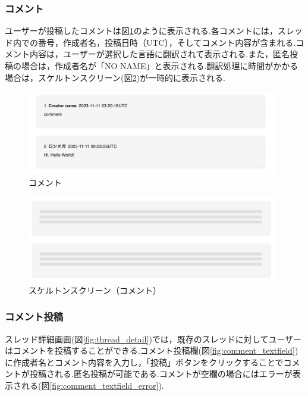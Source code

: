 \documentclass[b5paper,12pt,dvipdfmx]{jsreport}
\begin{document}
\newpage

\subsubsection{コメント}
ユーザーが投稿したコメントは図\ref{fig:comment}のように表示される.各コメントには，スレッド内での番号，作成者名，投稿日時（UTC），そしてコメント内容が含まれる.コメント内容は，ユーザーが選択した言語に翻訳されて表示される.また，匿名投稿の場合は，作成者名が「NO NAME」と表示される.翻訳処理に時間がかかる場合は，スケルトンスクリーン(図\ref{fig:comment_skeleton})が一時的に表示される.

\begin{figure}[H]
	\centering
    \includegraphics[width=110mm,height=36.57mm]{./img/feature/comment.png}
	\caption{コメント}
	\label{fig:comment}
\end{figure}

\begin{figure}[H]
	\centering
    \includegraphics[width=110mm,height=37.73mm]{./img/feature/comment_skeleton.png}
	\caption{スケルトンスクリーン（コメント）}
	\label{fig:comment_skeleton}
\end{figure}

\newpage

\subsubsection{コメント投稿}
スレッド詳細画面(図\ref{fig:thread_detail})では，既存のスレッドに対してユーザーはコメントを投稿することができる.コメント投稿欄(図\ref{fig:comment_textfield})に作成者名とコメント内容を入力し，「投稿」ボタンをクリックすることでコメントが投稿される.匿名投稿が可能である.コメントが空欄の場合にはエラーが表示される(図\ref{fig:comment_textfield_error}).
\end{document}
